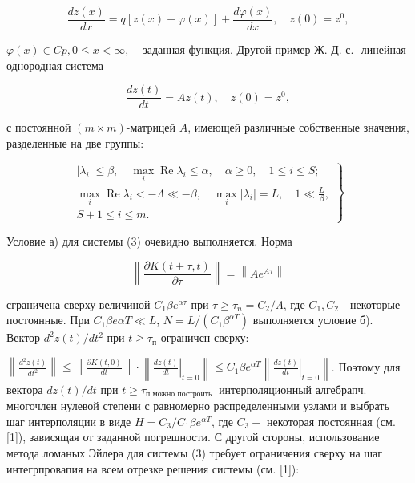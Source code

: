 \documentclass[10pt]{article}
\begin{document}
\[

\frac{d z(x)}{d x}=q[z(x)-\varphi(x)]+\frac{d \varphi(x)}{d x}, \quad z(0)=z^{0},

\]



$\varphi(x) \in C p, 0 \leqslant x<\infty,-$ заданная функция. Другой пример Ж. Д. с.- линейная однородная система



\[

\frac{d z(t)}{d t}=A z(t), \quad z(0)=z^{0},

\]



с постоянной $(m \times m)$-матрицей $A$, имеющей различные собственные значения, разделенные на две группы:



\[

\left.\begin{array}{c}

\left|\lambda_{i}\right| \leqslant \beta, \quad \max _{i} \operatorname{Re} \lambda_{i} \leqslant \alpha, \quad \alpha \geqslant 0, \quad 1 \leqslant i \leqslant S ; \\

\max _{i} \operatorname{Re} \lambda_{i}<-\Lambda \ll-\beta, \quad \max _{i}\left|\lambda_{i}\right|=L, \quad 1 \ll \frac{L}{\beta}, \\

S+1 \leqslant i \leqslant m .

\end{array}\right\}

\]



Условие а) для системы (3) очевидно выполняется. Норма



\[

\left\|\frac{\partial K(t+\tau, t)}{\partial \tau}\right\|=\left\|A e^{A \tau}\right\|

\]



сграничена сверху величиной $C_{1} \beta e^{\alpha \tau}$ при $\tau \geqslant \tau_{n}=C_{2} / \Lambda$, где $C_{1}, C_{2}$ - некоторые постоянные. При $C_{1} \beta e \alpha T \ll L$, $N=L /\left(C_{1} \beta^{\alpha T}\right)$ выполняется условие б). Вектор $d^{2} z(t) / d t^{2}$ при $t \geqslant \tau_{п}$ ограничсн сверху:



$\left\|\frac{d^{2} z(t)}{d t^{2}}\right\| \leqslant\left\|\frac{\partial K(t, 0)}{d t}\right\| \cdot\left\|\left.\frac{d z(t)}{d t}\right|_{t=0}\right\| \leqslant C_{1} \beta e^{\alpha T}\left\|\left.\frac{d z(t)}{d t}\right|_{t=0}\right\|$. Поэтому для вектора $d z(t) / d t$ при $t \geqslant \tau_{\text {п можно построить }}$ интерполяционный алгебрапч. многочлен нулевой степени с равномерно распределенными узлами и выбрать шаг интерполяции в виде $H=C_{3} / C_{1} \beta e^{\alpha T}$, где $C_{3}-$ некоторая постоянная (см. [1]), зависящая от заданной погрешности. С другой стороны, использование метода ломаных Эйлера для системы (3) требует ограничения сверху на шаг интегрпровапия на всем отрезке решения системы (см. [1]):
\end{document}
